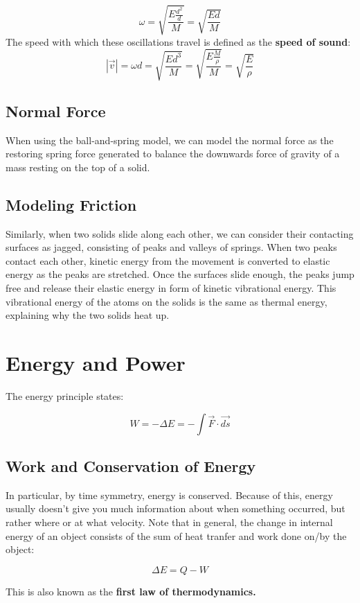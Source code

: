 \documentclass{article}
\begin{document}
$$ \omega=\sqrt{\frac{E\frac{d^2}{d}}{M}}= \sqrt{\frac{Ed}{M}}$$
The speed with which these oscillations travel is defined as the \textbf{speed of sound}:
$$|\vec{v}|=\omega d=\sqrt{\frac{Ed^3}{M}}=\sqrt{\frac{E\frac{M}{\rho}}{M}}=\sqrt{\frac{E}{\rho}} $$

\subsection{Normal Force}

When using the ball-and-spring model, we can model the normal force as the restoring spring force generated to balance the downwards force of gravity of a mass resting on the top of a solid.

\subsection{Modeling Friction}

Similarly, when two solids slide along each other, we can consider their contacting surfaces as jagged, consisting of peaks and valleys of springs. When two peaks contact each other, kinetic energy from the movement is converted to elastic energy as the peaks are stretched. Once the surfaces slide enough, the peaks jump free and release their elastic energy in form of kinetic vibrational energy. This vibrational energy of the atoms on the solids is the same as thermal energy, explaining why the two solids heat up.

\section{Energy and Power}

The energy principle states:

$$W=-\Delta E= -\int \vec{F}\cdot \vec{ds}$$

\subsection{Work and Conservation of Energy}
In particular, by time symmetry, energy is conserved. Because of this, energy usually doesn't give you much information about when something occurred, but rather where or at what velocity. Note that in general, the change in internal energy of an object consists of the sum of heat tranfer and work done on/by the object:

$$\Delta E = Q-W$$

This is also known as the \textbf{first law of thermodynamics.}
\end{document}
